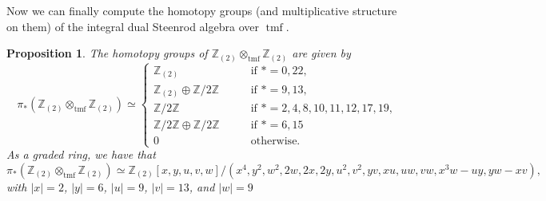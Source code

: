 \documentclass[11pt,leqno]{article}
\newcommand{\zz}{\mathbb{Z}}
\DeclareMathOperator{\tmf}{tmf}
\newtheorem*{short hand}{theorem name}
\theoremstyle{plain}  %
\newtheorem{proposition}{Proposition}[section]
\theoremstyle{definition}
\numberwithin{equation}{section}
\begin{document}
Now we can finally compute the homotopy groups (and multiplicative structure on them) of the integral dual Steenrod algebra over $\tmf$.
\begin{proposition}\label{prop3.9}
	The homotopy groups of $\zz_{(2)}\otimes_{\tmf}\zz_{(2)}$ are given by
$$\pi_*(\zz_{(2)}\otimes_{\tmf}\zz_{(2)})\simeq \begin{cases}
	\zz_{(2)} &\qquad \text{if } *=0,22,\\
	\zz_{(2)}\oplus\zz/2\zz &\qquad \text{if } *=9,13,\\
	\zz/2\zz & \qquad \text{if } *=2,4,8,10,11,12,17,19,\\
	\zz/2\zz\oplus\zz/2\zz &\qquad \text{if } *=6,15\\
	0 &\qquad \text{otherwise}.
\end{cases}$$
As a graded ring, we have that $$\pi_*(\zz_{(2)}\otimes_{\tmf}\zz_{(2)})\simeq \zz_{(2)}[x,y,u,v,w]/(x^4,y^2,w^2,2w,2x,2y,u^2,v^2,yv,xu,uw,vw,x^3w-uy,yw-xv),$$ with $|x|=2$, $|y|=6$, $|u|=9$, $|v|=13$, and $|w|=9$
\end{proposition}
\end{document}
